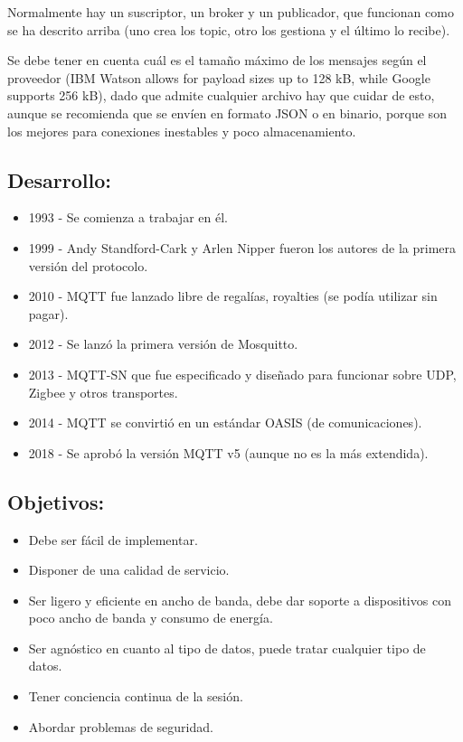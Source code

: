 \documentclass[12pt, twoside, openright]{report} %
\begin{document}
Normalmente hay un suscriptor, un broker y un publicador, que funcionan como se ha descrito arriba (uno crea los topic, otro los gestiona y el último lo recibe).

Se debe tener en cuenta cuál es el tamaño máximo de los mensajes según el proveedor (IBM Watson allows for payload sizes up to 128 kB, while Google supports 256 kB), dado que admite cualquier archivo hay que cuidar de esto, aunque se recomienda que se envíen en formato JSON o en binario, porque son los mejores para conexiones inestables y poco almacenamiento.

\subsection{Desarrollo:}
\begin{itemize}
	\item 1993 - Se comienza a trabajar en él.
	\item 1999 - Andy Standford-Cark y Arlen Nipper fueron los autores de la primera versión del protocolo.
	\item 2010 - MQTT fue lanzado libre de regalías, royalties (se podía utilizar sin pagar).
	\item 2012 - Se lanzó la primera versión de Mosquitto.
	\item 2013 - MQTT-SN que fue especificado y diseñado para funcionar sobre UDP, Zigbee y otros transportes.
	\item 2014 - MQTT se convirtió en un estándar OASIS (de comunicaciones).
	\item 2018 - Se aprobó la versión MQTT v5 (aunque no es la más extendida).
\end{itemize}

\subsection{Objetivos:}
\begin{itemize}
	\item Debe ser fácil de implementar.
	\item Disponer de una calidad de servicio.
	\item Ser ligero y eficiente en ancho de banda, debe dar soporte a dispositivos con poco ancho de banda y consumo de energía.
	\item Ser agnóstico en cuanto al tipo de datos, puede tratar cualquier tipo de datos.
	\item Tener conciencia continua de la sesión.
	\item Abordar problemas de seguridad.
\end{itemize}
\end{document}
